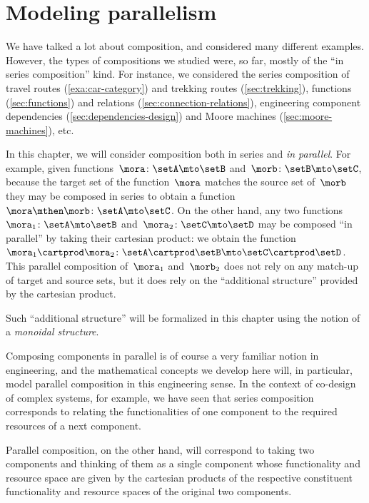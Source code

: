 

\section{Modeling parallelism}
\label{sec:modeling-parallelism}



We have talked a lot about composition, and considered many different examples.
However, the types of compositions we studied were, so far, mostly of the ``in series composition'' kind.
For instance, we considered the series composition of travel routes (\cref{exa:car-category}) and trekking routes (\cref{sec:trekking}), functions (\cref{sec:functions}) and relations (\cref{sec:connection-relations}), engineering component dependencies (\cref{sec:dependencies-design}) and Moore machines (\cref{sec:moore-machines}), etc.


In this chapter, we will consider composition both in series and \emph{in parallel}.
For example, given functions~$\mora\colon \setA \mto \setB$ and~$\morb\colon \setB \mto \setC$, because the target set of the function~$\mora$ matches the source set of~$\morb$ they may be composed in series to obtain a function~$\mora \mthen \morb\colon \setA \mto \setC$.
On the other hand, any two functions~$\mora_1 \colon \setA \mto \setB$ and~$\mora_2 \colon \setC \mto \setD$ may be composed ``in parallel'' by taking their cartesian product: we obtain the function~$\mora_1 \cartprod \mora_2\colon \setA \cartprod \setB \mto \setC \cartprod \setD$.
This parallel composition of~$\mora_1$ and~$\morb_2$ does not rely on any match-up of target and source sets, but it does rely on the ``additional structure'' provided by the cartesian product.

Such ``additional structure'' will be formalized in this chapter using the notion of a \emph{monoidal structure}.

Composing components in parallel is of course a very familiar notion in engineering, and the mathematical concepts we develop here will, in particular, model parallel composition in this engineering sense.
In the context of co-design of complex systems, for example, we have seen that series composition corresponds to relating the functionalities of one component to the required resources of a next component.


Parallel composition, on the other hand, will correspond to taking two components and thinking of them as a single component whose functionality and resource space are given by the cartesian products of the respective constituent functionality and resource spaces of the original two components.

